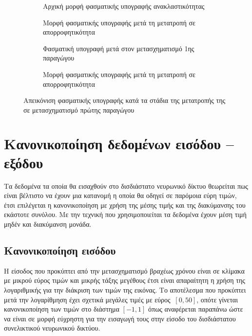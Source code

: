 \begin{figure}[H]
    \begin{subfigure}{0.5\textwidth}
        
        \caption{Αρχική μορφή φασματικής υπογραφής ανακλαστικότητας}
        \label{fig:abs_sg1_initial}
    \end{subfigure}
    \begin{subfigure}{0.5\textwidth}
        
        \caption{Μορφή φασματικής υπογραφής μετά τη μετατροπή σε απορροφητικότητα}
        \label{fig:abs_sg1_abs}
    \end{subfigure}
    \begin{subfigure}{0.5\textwidth}
        
        \caption{Φασματική υπογραφή μετά στον μετασχηματισμό  1ης παραγώγου}
        \label{fig:abs_sg1_transform_notches}
    \end{subfigure}
    \begin{subfigure}{0.5\textwidth}
        
        \caption{Μορφή φασματικής υπογραφής μετά τη μετατροπή σε απορροφητικότητα}
        \label{fig:abs_sg1_transform_fixed}
    \end{subfigure}
    \caption{Απεικόνιση φασματικής υπογραφής κατά τα στάδια της μετατροπής της σε μετασχηματισμό  πρώτης παραγώγου}
\end{figure}


\section{Κανονικοποίηση δεδομένων εισόδου -- εξόδου}
Τα δεδομένα τα οποία θα εισαχθούν στο δισδιάστατο νευρωνικό δίκτυο θεωρείται πως είναι βέλτιστο να έχουν μια κατανομή η οποία θα οδηγεί σε παρόμοια εύρη τιμών, έτσι επιλέγεται η κανονικοποίηση με χρήση της μέσης τιμής και της διακύμανσης του εκάστοτε συνόλου. Με την τεχνική που χρησιμοποιείται τα δεδομένα έχουν μέση τιμή μηδέν και διακύμανση μονάδα.

\subsection{Κανονικοποίηση εισόδου}
Η είσοδος που προκύπτει από την μετασχηματισμό  βραχέως χρόνου είναι σε κλίμακα με μικρού εύρος τιμών και μικρής τάξης μεγέθους έτσι είναι απαραίτητη η χρήση της λογαριθμικής για την διάκριση των τιμών της εικόνας. Το αποτέλεσμα που προκύπτει μετά την λογαρίθμηση έχει σχετικά μεγάλες τιμές με εύρος $~[0,50]$, οπότε γίνεται κανονικοποίηση των τιμών στο διάστημα $[-1,1]$ όπως αναφέρεται παραπάνω ώστε να είναι σε μορφή εύχρηστη για την εισαγωγή τους στην είσοδο του δισδιάστατου συνελικτικού νευρωνικού δικτύου.
